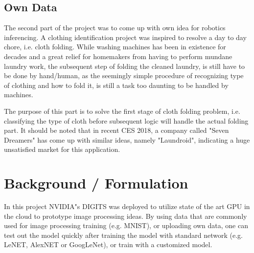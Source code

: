 \documentclass[10pt,journal,compsoc]{IEEEtran}
\begin{document}
\subsection{Own Data}
The second part of the project was to come up with own idea for robotics inferencing. A clothing identification project was inspired to resolve a day to day chore, i.e. cloth folding.  While washing machines has been in existence for decades and a great relief for homemakers from having to perform mundane laundry work, the subsequent step of folding the cleaned laundry, is still have to be done by hand/human, as the seemingly simple procedure of recognizing type of clothing and how to fold it, is still a task too daunting to be handled by machines.  \linebreak 

The purpose of this part is to solve the first stage of cloth folding problem, i.e. classifying the type of cloth before subsequent logic will handle the actual folding part.  It should be noted that in recent CES 2018, a company called "Seven Dreamers" has come up with similar ideas\cite{theverge}, namely "Laundroid", indicating a huge unsatisfied market for this application.



\section{Background / Formulation}
In this project NVIDIA"s DIGITS was deployed to utilize state of the art GPU in the cloud to prototype image processing ideas.  By using data that are commonly used for image processing training (e.g. MNIST), or uploading own data, one can test out the model quickly after training the model with standard network (e.g. LeNET, AlexNET or GoogLeNet), or train with a customized model. \linebreak
\end{document}

